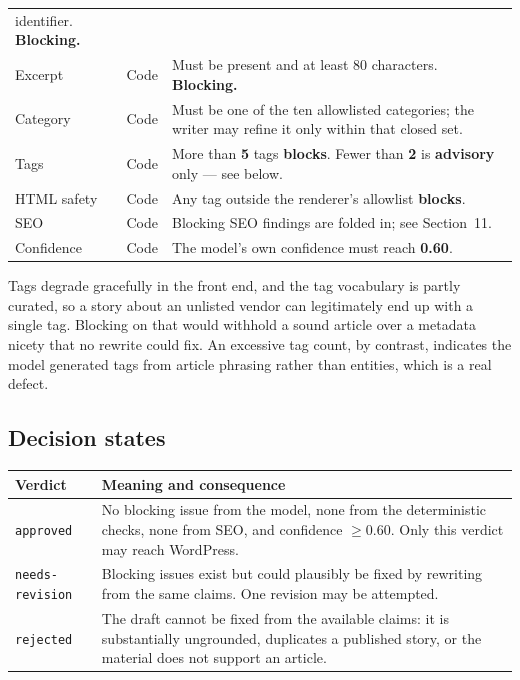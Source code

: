 \documentclass[11pt,a4paper]{article}
\newcommand{\brk}{\hyphenpenalty=0\exhyphenpenalty=0\relax}
\newcommand{\code}[1]{\texttt{\small\brk #1}}
\begin{document}
\begin{center}
\begin{tabularx}{\textwidth}{@{}p{3.5cm} c >{\RaggedRight}X@{}}
  identifier. \textbf{Blocking.} \\
Excerpt & Code & Must be present and at least 80 characters. \textbf{Blocking.} \\
Category & Code & Must be one of the ten allowlisted categories; the writer may
  refine it only within that closed set. \\
Tags & Code & More than \textbf{5} tags \textbf{blocks}. Fewer than \textbf{2} is
  \textbf{advisory} only --- see below. \\
HTML safety & Code & Any tag outside the renderer's allowlist \textbf{blocks}. \\
SEO & Code & Blocking SEO findings are folded in; see Section~11. \\
Confidence & Code & The model's own confidence must reach \textbf{0.60}. \\
\bottomrule
\end{tabularx}
\end{center}

\begin{infobox}
Tags degrade gracefully in the front end, and the tag vocabulary is partly
curated, so a story about an unlisted vendor can legitimately end up with a single
tag. Blocking on that would withhold a sound article over a metadata nicety that
no rewrite could fix. An excessive tag count, by contrast, indicates the model
generated tags from article phrasing rather than entities, which is a real defect.
\end{infobox}

\subsection{Decision states}

\begin{center}
\small
\begin{tabularx}{\textwidth}{@{}l >{\RaggedRight}X@{}}
\toprule
\textbf{Verdict} & \textbf{Meaning and consequence} \\
\midrule
\code{approved} & No blocking issue from the model, none from the deterministic
  checks, none from SEO, and confidence $\geq 0.60$. Only this verdict may reach
  WordPress. \\
\code{needs-revision} & Blocking issues exist but could plausibly be fixed by
  rewriting from the same claims. One revision may be attempted. \\
\code{rejected} & The draft cannot be fixed from the available claims: it is
  substantially ungrounded, duplicates a published story, or the material does not
  support an article. \\
\bottomrule
\end{tabularx}
\end{center}
\end{document}

